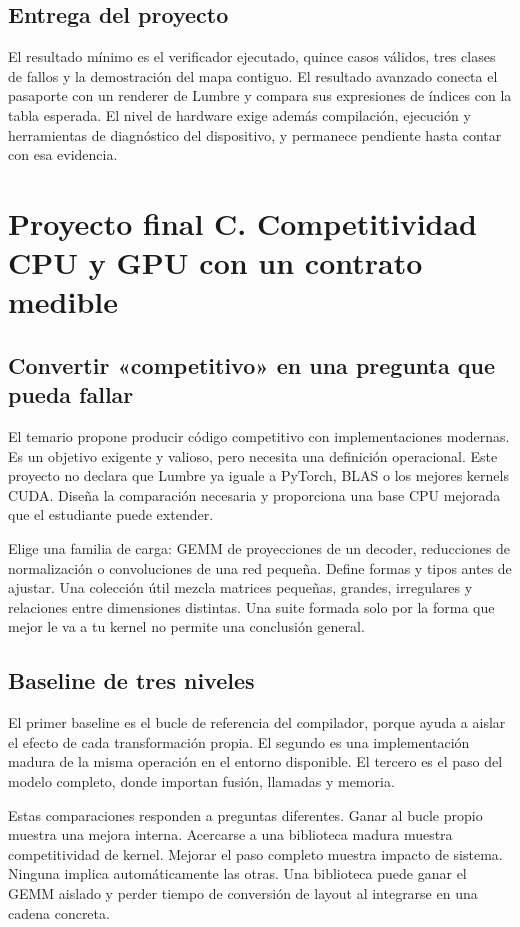 \documentclass[12pt,a4paper,oneside]{report}
\begin{document}
\section{Entrega del proyecto}
El resultado mínimo es el verificador ejecutado, quince casos válidos, tres clases de fallos y la demostración del mapa contiguo. El resultado avanzado conecta el pasaporte con un renderer de Lumbre y compara sus expresiones de índices con la tabla esperada. El nivel de hardware exige además compilación, ejecución y herramientas de diagnóstico del dispositivo, y permanece pendiente hasta contar con esa evidencia.

\chapter{Proyecto final C. Competitividad CPU y GPU con un contrato medible}
\label{project:competitivo}
\section{Convertir «competitivo» en una pregunta que pueda fallar}
El temario propone producir código competitivo con implementaciones modernas. Es un objetivo exigente y valioso, pero necesita una definición operacional. Este proyecto no declara que Lumbre ya iguale a PyTorch, BLAS o los mejores kernels CUDA. Diseña la comparación necesaria y proporciona una base CPU mejorada que el estudiante puede extender.

Elige una familia de carga: GEMM de proyecciones de un decoder, reducciones de normalización o convoluciones de una red pequeña. Define formas y tipos antes de ajustar. Una colección útil mezcla matrices pequeñas, grandes, irregulares y relaciones entre dimensiones distintas. Una suite formada solo por la forma que mejor le va a tu kernel no permite una conclusión general.

\section{Baseline de tres niveles}
El primer baseline es el bucle de referencia del compilador, porque ayuda a aislar el efecto de cada transformación propia. El segundo es una implementación madura de la misma operación en el entorno disponible. El tercero es el paso del modelo completo, donde importan fusión, llamadas y memoria.

Estas comparaciones responden a preguntas diferentes. Ganar al bucle propio muestra una mejora interna. Acercarse a una biblioteca madura muestra competitividad de kernel. Mejorar el paso completo muestra impacto de sistema. Ninguna implica automáticamente las otras. Una biblioteca puede ganar el GEMM aislado y perder tiempo de conversión de layout al integrarse en una cadena concreta.
\end{document}
